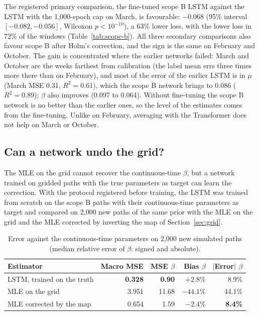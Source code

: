 \documentclass[preprint,12pt,authoryear]{elsarticle}
\begin{document}
The registered primary comparison, the fine-tuned scope B LSTM against the LSTM with the
1,000-epoch cap on March, is favourable: $-0.068$ (95\% interval $[-0.082,-0.056]$, Wilcoxon
$p<10^{-10}$), a 63\% lower loss, with the lower loss in 72\% of the windows
(Table~\ref{tab:scope-b}). All three secondary comparisons also favour scope B after Holm's
correction, and the sign is the same on February and October. The gain is concentrated where
the earlier networks failed: March and October are the weeks farthest from calibration (the
label mean errs three times more there than on February), and most of the error of the
earlier LSTM is in $\mu$ (March MSE 0.31, $R^2=0.61$), which the scope B network brings to
0.086 ($R^2=0.89$); $\beta$ also improves (0.097 to 0.064). Without fine-tuning the scope B
network is no better than the earlier ones, so the level of the estimates comes from the
fine-tuning. Unlike on February, averaging with the Transformer does not help on
March or October.

\subsection{Can a network undo the grid?}
\label{sec:grid-correction}

The MLE on the grid cannot recover the continuous-time $\beta$, but a network trained on
gridded paths with the true parameters as target can learn the correction. With the protocol
registered before training, the LSTM was trained from scratch on the scope B paths with their
continuous-time parameters as target and compared on 2,000 new paths of the same prior with
the MLE on the grid and the MLE corrected by inverting the map of Section~\ref{sec:grid}.

\begin{table}[t]
\centering
\caption{Error against the continuous-time parameters on 2,000 new simulated paths (median
relative error of $\beta$: signed and absolute).}
\label{tab:grid-correction}
\small
\begin{tabular}{lrrrr}
\toprule
Estimator & Macro MSE & MSE $\beta$ & Bias $\beta$ & $|$Error$|$ $\beta$\\
\midrule
LSTM, trained on the truth & \textbf{0.328} & \textbf{0.90} & $+2.8\%$ & 8.9\%\\
MLE on the grid & 3.951 & 11.68 & $-44.1\%$ & 44.1\%\\
MLE corrected by the map & 0.654 & 1.59 & $-2.4\%$ & \textbf{8.4\%}\\
\bottomrule
\end{tabular}
\end{table}
\end{document}

